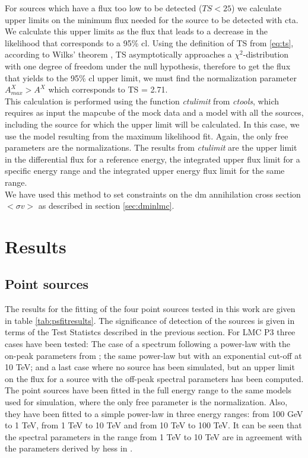\documentclass[main.tex]{subfiles}
\begin{document}
For sources which have a flux too low to be detected ($TS < 25$) we calculate upper limits on the minimum flux needed for the source to be detected with \gls{cta}. We calculate this upper limits as the flux that leads to a decrease in the likelihood that corresponds to a 95\% \gls{cl}. Using the definition of TS from \ref{eq:ts}, according to Wilks' theorem \cite{wilks1938}, TS asymptotically approaches a $\chi^2$-distribution with one degree of freedom under the null hypothesis, therefore to get the flux that yields to the 95\% \gls{cl} upper limit, we must find the normalization parameter $A^X_{max} > A^{X}$ which corresponds to TS = 2.71.\\
This calculation is performed using the function \textit{ctulimit} from \textit{ctools}, which requires as input the mapcube of the mock data and a model with all the sources, including the source for which the upper limit will be calculated. In this case, we use the model resulting from the maximum likelihood fit. Again, the only free parameters are the normalizations. The results from \textit{ctulimit} are the upper limit in the differential flux for a reference energy, the integrated upper flux limit for a specific energy range and the integrated upper energy flux limit for the same range.\\
We have used this method to set constraints on the \gls{dm} annihilation cross section $<\sigma v>$ as described in section \ref{sec:dminlmc}.

\section{Results}\label{sec:results}
        
\subsection{Point sources}

The results for the fitting of the four point sources tested in this work are given in table \ref{tab:psfitresults}. The significance of detection of the sources is given in terms of the Test Statistcs described in the previous section. For LMC P3 three cases have been tested: The case of a spectrum following a power-law with the on-peak parameters from \cite{2017HESSLMCP3}; the same power-law but with an exponential cut-off at 10 TeV; and a last case where no source has been simulated, but an upper limit on the flux for a source with the off-peak spectral parameters has been computed.\\
The point sources have been fitted in the full energy range to the same models used for simulation, where the only free parameter is the normalization. Also, they have been fitted to a simple power-law in three energy ranges: from 100 GeV to 1 TeV, from 1 TeV to 10 TeV and from 10 TeV to 100 TeV. It can be seen that the spectral parameters in the range from 1 TeV to 10 TeV are in agreement with the parameters derived by \gls{hess} in \cite{2015HESSTeVLMC}.
\end{document}
